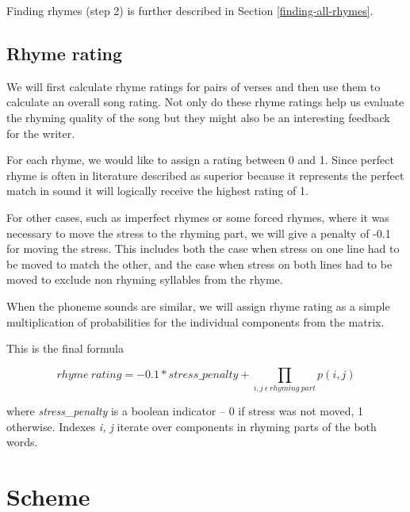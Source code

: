 Finding rhymes (step 2) is further described in Section \ref{finding-all-rhymes}.


\subsection{Rhyme rating}
 We will first calculate rhyme ratings for pairs of verses and then use them to calculate an overall song rating. Not only do these rhyme ratings help us evaluate the rhyming quality of the song but they might also be an interesting feedback for the writer. 
 
 For each rhyme, we would like to assign a rating between 0 and 1. Since perfect rhyme is often in literature described as superior because it represents the perfect match in sound it will logically receive the highest rating of 1.
 
 For other cases, such as imperfect rhymes or some forced rhymes, where it was necessary to move the stress to the rhyming part, we will give a penalty of -0.1 for moving the stress. This includes both the case when stress on one line had to be moved to match the other, and the case when stress on both lines had to be moved to exclude non rhyming syllables from the rhyme.
  
	When the phoneme sounds are similar, we will assign rhyme rating as a simple multiplication of probabilities for the individual components from the matrix. 

This is the final formula
	
	\[rhyme\ rating = -0.1 * stress\_penalty + \prod_{i,j\ \epsilon\ rhyming\ part} p(i,j) \]
	
where \textit{stress\_penalty} is a boolean indicator -- 0 if stress was not moved, 1 otherwise. Indexes \textit{i, j} iterate over components in rhyming parts of the both words.





\section{Scheme}
